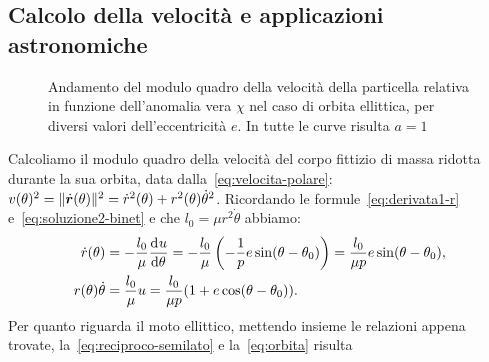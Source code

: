 \subsection{Calcolo della velocità e applicazioni astronomiche}
\label{sec:velocita}
\begin{figure}
  \centering
  
  \caption[Andamento della velocità in funzione dell'anomalia vera]{Andamento
    del modulo quadro della velocità della particella relativa in funzione
    dell'anomalia vera $\chi$ nel caso di orbita ellittica, per diversi valori
    dell'eccentricità $e$. In tutte le curve risulta $a=1$}
  \label{fig:velocita}
\end{figure}
Calcoliamo il modulo quadro della velocità del corpo fittizio di massa ridotta
durante la sua orbita, data dalla~\eqref{eq:velocita-polare}: $v(\theta)^2 =
\lVert\dot{\bm{r}}(\theta)\rVert^2 = \dot{r}^2(\theta) +
r^2(\theta)\dot{\theta}^2$. Ricordando le formule~\eqref{eq:derivata1-r}
e~\eqref{eq:soluzione2-binet} e che $l_0=\mu r^2\dot{\theta}$ abbiamo:
\begin{subequations}
  \begin{align}
    \dot{r}(\theta) &= -\frac{l_0}{\mu}\frac{{\mathop{}\!\mathrm{d}^{}}u}{\mathop{}\!\mathrm{d} {\theta}^{}} = -\frac{l_0}{\mu}
    \left( -\frac{1}{p}e\sin(\theta-\theta_0) \right) = \frac{l_0}{\mu p}e
    \sin(\theta -
    \theta_0), \label{eq:velocita-radiale}\\
    r(\theta)\dot{\theta} &= \frac{l_0}{\mu}u =
    \frac{l_0}{\mu p}(1+e\cos(\theta-\theta_0)). \label{eq:velocita-tangenziale}
  \end{align}
\end{subequations}
Per quanto riguarda il moto ellittico, mettendo insieme le relazioni appena
trovate, la~\eqref{eq:reciproco-semilato} e la~\eqref{eq:orbita} risulta
